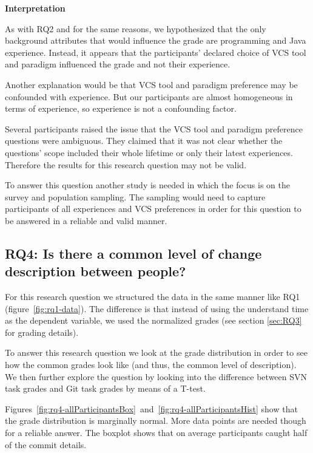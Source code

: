 \documentclass[letterpaper]{article}
\begin{document}


\textbf{Interpretation}

As with RQ2 and for the same reasons, we hypothesized that the only background attributes that would influence the grade are programming and Java experience.
Instead, it appears that the participants' declared choice of VCS tool and paradigm influenced the grade and not their experience.

Another explanation would be that VCS tool and paradigm preference may be confounded with experience.
But our participants are almost homogeneous in terms of experience, so experience is not a confounding factor.

Several participants raised the issue that the VCS tool and paradigm preference questions were ambiguous.
They claimed that it was not clear whether the questions' scope included their whole lifetime or only their latest experiences.
Therefore the results for this research question may not be valid.

To answer this question another study is needed in which the focus is on the survey and population sampling.
The sampling would need to capture participants of all experiences and VCS preferences in order for this question to be answered in a reliable and valid manner.

\subsection{RQ4: Is there a common level of change description between people?}
\label{seq:rq4}

For this research question we structured the data in the same manner like RQ1 (figure~\ref{fig:rq1-data}).
The difference is that instead of using the understand time as the dependent variable, we used the normalized grades (see section \ref{sec:RQ3} for grading details).

To answer this research question we look at the grade distribution in order to see how the common grades look like (and thus, the common level of description).
We then further explore the question by looking into the difference between SVN task grades and Git task grades by means of a T-test.

Figures~\ref{fig:rq4-allParticipantsBox}~and~\ref{fig:rq4-allParticipantsHist} show that the grade distribution is marginally normal.
More data points are needed though for a reliable answer.
The boxplot shows that on average participants caught half of the commit details.
\end{document}
